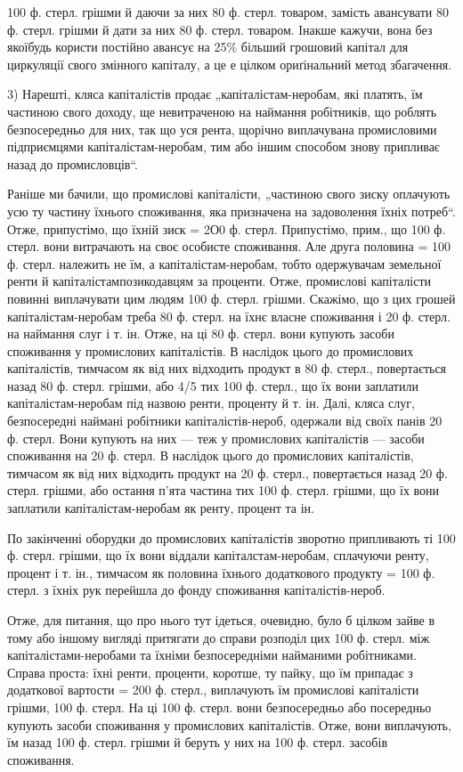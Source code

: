 100 ф. стерл. грішми й даючи за них 80 ф. стерл. товаром, замість авансувати 80 ф. стерл. грішми й
дати за них 80 ф. стерл. товаром. Інакше кажучи, вона без якоїбудь користи постійно авансує на 25\%
більший грошовий капітал для циркуляції свого змінного капіталу, а це е цілком ориґінальний метод
збагачення.

3) Нарешті, кляса капіталістів продає „капіталістам-неробам, які платять, їм частиною свого доходу,
ще невитраченою на наймання робітників, що роблять безпосередньо для них, так що уся рента, щорічно
виплачувана промисловими підприємцями капіталістам-неробам, тим або іншим способом знову припливає
назад до промисловців“.

Раніше ми бачили, що промислові капіталісти, „частиною свого зиску оплачують усю ту частину їхнього
споживання, яка призначена на задоволення їхніх потреб“. Отже, припустімо, що їхній зиск = 2О0 ф.
стерл. Припустімо, прим., що 100 ф. стерл. вони витрачають на своє особисте споживання. Але друга
половина = 100 ф. стерл. належить не їм, а капіталістам-неробам, тобто одержувачам земельної ренти й
капіталістампозикодавцям
за проценти. Отже, промислові капіталісти повинні виплачувати цим людям 100 ф. стерл. грішми.
Скажімо, що з цих грошей капіталістам-неробам треба 80 ф. стерл. на їхнє власне споживання і 20 ф.
стерл. на наймання слуг і т. ін. Отже, на ці 80 ф. стерл. вони купують засоби споживання у
промислових капіталістів. В наслідок цього до промислових капіталістів, тимчасом як від них
відходить продукт в 80 ф. стерл., повертається назад 80 ф. стерл. грішми, або 4/5 тих 100 ф. стерл.,
що їх вони заплатили капіталістам-неробам під назвою ренти, проценту й т. ін. Далі, кляса слуг,
безпосередні наймані робітники капіталістів-нероб, одержали від своїх панів 20 ф. стерл. Вони
купують на них — теж у промислових капіталістів — засоби споживання на 20 ф. стерл. В наслідок цього
до промислових капіталістів, тимчасом як від них відходить продукт на 20 ф. стерл., повертається
назад 20 ф. стерл. грішми, або остання п’ята частина тих 100 ф. стерл. грішми, що їх вони заплатили
капіталістам-неробам як ренту, процент та ін.

По закінченні оборудки до промислових капіталістів зворотно припливають ті 100 ф. стерл. грішми, що
їх вони віддали капіталстам-неробам, сплачуючи ренту, процент і т. ін., тимчасом як половина їхнього
додаткового продукту = 100 ф. стерл. з їхніх рук перейшла до фонду споживання капіталістів-нероб.

Отже, для питання, що про нього тут ідеться, очевидно, було б цілком зайве в тому або іншому вигляді
притягати до справи розподіл цих 100 ф. стерл. між капіталістами-неробами та їхніми безпосередніми
найманими робітниками. Справа проста: їхні ренти, проценти, коротше, ту пайку, що їм припадає з
додаткової вартости = 200 ф. стерл., виплачують їм промислові капіталісти грішми, 100 ф. стерл. На
ці 100 ф. стерл. вони безпосередньо або посередньо купують засоби споживання у промислових
капіталістів. Отже, вони виплачують, їм назад 100 ф. стерл. грішми й беруть у них на 100 ф. стерл.
засобів споживання.
